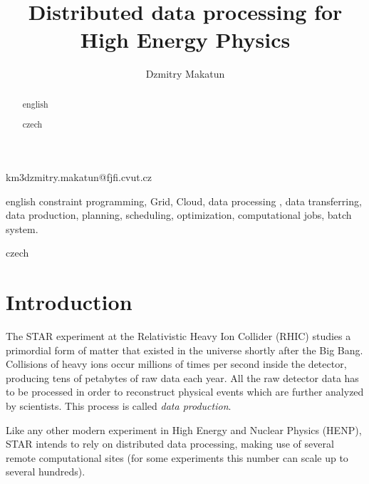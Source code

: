 \documentclass[english]{ddny}
\begin{document}
\title{Distributed data processing for High Energy Physics}
\author{Dzmitry Makatun}{km}{3}{dzmitry.makatun@fjfi.cvut.cz}




\maketitle

\begin{abstract}{english}

\end{abstract}

\begin{keywords}{english}
constraint programming, Grid, Cloud, data processing , data transferring, data production, planning, scheduling, optimization, computational jobs, batch system.
\end{keywords}

\begin{abstract}{czech}

\end{abstract}

\begin{keywords}{czech}

\end{keywords}

\tableofcontents


\section{Introduction}
The STAR experiment at the Relativistic Heavy Ion Collider (RHIC) studies a primordial form of matter that existed in the universe shortly after the Big Bang. Collisions of heavy ions occur millions of times per second inside the detector, producing tens of petabytes of raw data each year. All the raw detector data has to be processed in order to reconstruct physical events which are further analyzed by scientists. This process is called \textit{data production}.

Like any other modern experiment in High Energy and Nuclear Physics (HENP), STAR intends to rely on distributed data processing, making use of several remote computational sites (for some experiments this number can scale up to several hundreds).
\end{document}
